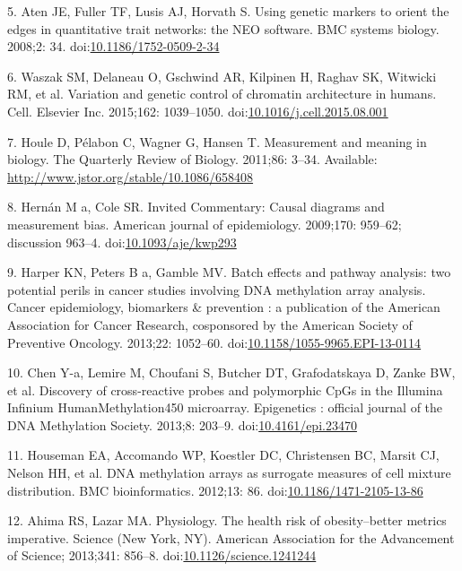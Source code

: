 \documentclass[]{article}
\begin{document}
\hypertarget{ref-Aten2008}{}
5. Aten JE, Fuller TF, Lusis AJ, Horvath S. Using genetic markers to
orient the edges in quantitative trait networks: the NEO software. BMC
systems biology. 2008;2: 34.
doi:\href{https://doi.org/10.1186/1752-0509-2-34}{10.1186/1752-0509-2-34}

\hypertarget{ref-Waszak2015}{}
6. Waszak SM, Delaneau O, Gschwind AR, Kilpinen H, Raghav SK, Witwicki
RM, et al. Variation and genetic control of chromatin architecture in
humans. Cell. Elsevier Inc. 2015;162: 1039--1050.
doi:\href{https://doi.org/10.1016/j.cell.2015.08.001}{10.1016/j.cell.2015.08.001}

\hypertarget{ref-Houle2011}{}
7. Houle D, Pélabon C, Wagner G, Hansen T. Measurement and meaning in
biology. The Quarterly Review of Biology. 2011;86: 3--34. Available:
\url{http://www.jstor.org/stable/10.1086/658408}

\hypertarget{ref-Hernan2009}{}
8. Hernán M a, Cole SR. Invited Commentary: Causal diagrams and
measurement bias. American journal of epidemiology. 2009;170: 959--62;
discussion 963--4.
doi:\href{https://doi.org/10.1093/aje/kwp293}{10.1093/aje/kwp293}

\hypertarget{ref-Harper2013}{}
9. Harper KN, Peters B a, Gamble MV. Batch effects and pathway analysis:
two potential perils in cancer studies involving DNA methylation array
analysis. Cancer epidemiology, biomarkers \& prevention : a publication
of the American Association for Cancer Research, cosponsored by the
American Society of Preventive Oncology. 2013;22: 1052--60.
doi:\href{https://doi.org/10.1158/1055-9965.EPI-13-0114}{10.1158/1055-9965.EPI-13-0114}

\hypertarget{ref-Chen2013a}{}
10. Chen Y-a, Lemire M, Choufani S, Butcher DT, Grafodatskaya D, Zanke
BW, et al. Discovery of cross-reactive probes and polymorphic CpGs in
the Illumina Infinium HumanMethylation450 microarray. Epigenetics :
official journal of the DNA Methylation Society. 2013;8: 203--9.
doi:\href{https://doi.org/10.4161/epi.23470}{10.4161/epi.23470}

\hypertarget{ref-Houseman2012}{}
11. Houseman EA, Accomando WP, Koestler DC, Christensen BC, Marsit CJ,
Nelson HH, et al. DNA methylation arrays as surrogate measures of cell
mixture distribution. BMC bioinformatics. 2012;13: 86.
doi:\href{https://doi.org/10.1186/1471-2105-13-86}{10.1186/1471-2105-13-86}

\hypertarget{ref-Ahima2013}{}
12. Ahima RS, Lazar MA. Physiology. The health risk of obesity--better
metrics imperative. Science (New York, NY). American Association for the
Advancement of Science; 2013;341: 856--8.
doi:\href{https://doi.org/10.1126/science.1241244}{10.1126/science.1241244}
\end{document}
